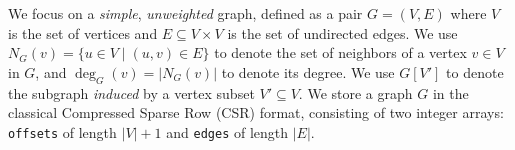 

We focus on a \emph{simple}, \emph{unweighted} graph, defined as a pair $G=(V,E)$ where $V$ is the set of vertices and $E\subseteq V\times V$ is the set of undirected edges. 
%
We use $N_G(v)=\{u\in V \mid (u,v)\in E\}$ to denote the set of neighbors of a vertex $v\in V$ in $G$, and $\deg_G(v)=|N_G(v)|$ to denote its degree.
% 
We use $G[V']$ to denote the subgraph \emph{induced} by a vertex subset $V'\subseteq V$. 
%
We store a graph $G$ in the classical Compressed Sparse Row (CSR) format, consisting of two integer arrays: \texttt{offsets} of length $|V|{+}1$ and \texttt{edges} of length $|E|$.

